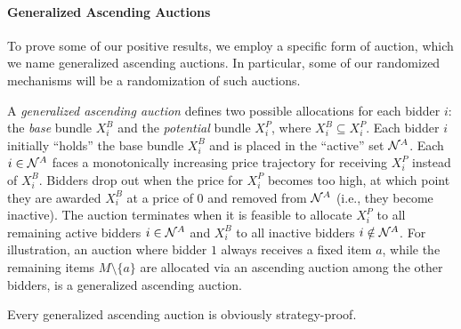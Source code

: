 \paragraph{Generalized Ascending Auctions}
To prove some of our positive results, we  employ a specific form of auction, which we name generalized ascending auctions. In particular, some of our randomized mechanisms will be a randomization of such auctions. 

A \emph{generalized ascending auction} defines two possible allocations for each bidder $i$: the \emph{base} bundle $X_i^{B}$ and the \emph{potential} bundle $X_i^{P}$, where $X_i^{B} \subseteq X_i^{P}$. Each bidder $i$ initially ``holds'' the base bundle $X_i^{B}$ and is placed in the ``active'' set $\mathcal{N}^{A}$.  
Each $i \in \mathcal{N}^{A}$ faces a monotonically increasing price trajectory for receiving $X_i^{P}$ instead of $X_i^{B}$. Bidders drop out when the price for $X_i^{P}$ becomes too high, at which point they are awarded $X_i^{B}$ at a price of $0$ and removed from $\mathcal{N}^{A}$ (i.e., they become inactive). The auction terminates when it is feasible to allocate $X_i^{P}$ to all remaining active bidders $i \in \mathcal{N}^{A}$ and $X_i^{B}$ to all inactive bidders $i \notin \mathcal{N}^{A}$.  
For illustration, an auction where bidder $1$ always receives a fixed item $a$, while the remaining items $M\setminus \{a\}$ are allocated via an ascending auction among the other bidders, is a generalized ascending auction.


\begin{lemma}\label{lemma-partial}
    Every generalized ascending auction is obviously strategy-proof. 
\end{lemma}


